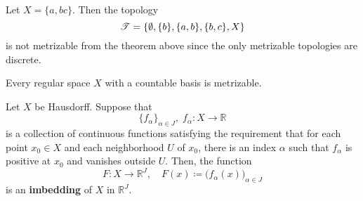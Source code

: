   \begin{example}
    Let $X = \{a, b c\}$. Then the topology 
    \begin{equation}
      \operatorname{\mathscr{T}} = \{\emptyset, \{b\}, \{a, b\}, \{b, c\}, X \}
    \end{equation} 
    is not metrizable from the theorem above since the only metrizable topologies are discrete. 
  \end{example}

  \begin{theorem}
    Every regular space $X$ with a countable basis is metrizable. 
  \end{theorem}

  \begin{theorem}
    Let $X$ be Hausdorff. Suppose that 
    \begin{equation}
      \{f_\alpha\}_{\alpha \in J}, \; f_\alpha: X \longrightarrow \mathbb{R}
    \end{equation}
    is a collection of continuous functions satisfying the requirement that for each point $x_0 \in X$ and each neighborhood $U$ of $x_0$, there is an index $\alpha$ such that $f_\alpha$ is positive at $x_0$ and vanishes outside $U$. Then, the function 
    \begin{equation}
      F: X \longrightarrow \mathbb{R}^J, \quad F(x) \coloneqq \big( f_\alpha (x)\big)_{\alpha \in J}
    \end{equation}
    is an \textbf{imbedding} of $X$ in $\mathbb{R}^J$.
  \end{theorem}



